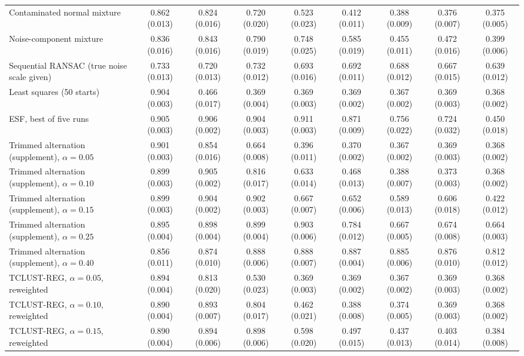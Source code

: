 \begin{table}[htbp]
{\begin{tabular}{lcccccccc}
Contaminated normal mixture & 0.862 (0.013) & 0.824 (0.016) & 0.720 (0.020) & 0.523 (0.023) & 0.412 (0.011) & 0.388 (0.009) & 0.376 (0.007) & 0.375 (0.005) \\
Noise-component mixture & 0.836 (0.016) & 0.843 (0.016) & 0.790 (0.019) & 0.748 (0.025) & 0.585 (0.019) & 0.455 (0.011) & 0.472 (0.016) & 0.399 (0.006) \\
Sequential RANSAC (true noise scale given) & 0.733 (0.013) & 0.720 (0.013) & 0.732 (0.012) & 0.693 (0.016) & 0.692 (0.011) & 0.688 (0.012) & 0.667 (0.015) & 0.639 (0.012) \\
Least squares (50 starts) & 0.904 (0.003) & 0.466 (0.017) & 0.369 (0.004) & 0.369 (0.003) & 0.369 (0.002) & 0.367 (0.002) & 0.369 (0.003) & 0.368 (0.002) \\
ESF, best of five runs & 0.905 (0.003) & 0.906 (0.002) & 0.904 (0.003) & 0.911 (0.003) & 0.871 (0.009) & 0.756 (0.022) & 0.724 (0.032) & 0.450 (0.018) \\
Trimmed alternation (supplement), $\alpha=0.05$ & 0.901 (0.003) & 0.854 (0.016) & 0.664 (0.008) & 0.396 (0.011) & 0.370 (0.002) & 0.367 (0.002) & 0.369 (0.003) & 0.368 (0.002) \\
Trimmed alternation (supplement), $\alpha=0.10$ & 0.899 (0.003) & 0.905 (0.002) & 0.816 (0.017) & 0.633 (0.014) & 0.468 (0.013) & 0.388 (0.007) & 0.373 (0.003) & 0.368 (0.002) \\
Trimmed alternation (supplement), $\alpha=0.15$ & 0.899 (0.003) & 0.904 (0.002) & 0.902 (0.003) & 0.667 (0.007) & 0.652 (0.006) & 0.589 (0.013) & 0.606 (0.018) & 0.422 (0.012) \\
Trimmed alternation (supplement), $\alpha=0.25$ & 0.895 (0.004) & 0.898 (0.004) & 0.899 (0.004) & 0.903 (0.006) & 0.784 (0.012) & 0.667 (0.005) & 0.674 (0.008) & 0.664 (0.003) \\
Trimmed alternation (supplement), $\alpha=0.40$ & 0.856 (0.011) & 0.874 (0.010) & 0.888 (0.006) & 0.888 (0.007) & 0.887 (0.004) & 0.885 (0.006) & 0.876 (0.010) & 0.812 (0.012) \\
TCLUST-REG, $\alpha=0.05$, reweighted & 0.894 (0.004) & 0.813 (0.020) & 0.530 (0.023) & 0.369 (0.003) & 0.369 (0.002) & 0.367 (0.002) & 0.369 (0.003) & 0.368 (0.002) \\
TCLUST-REG, $\alpha=0.10$, reweighted & 0.890 (0.004) & 0.893 (0.007) & 0.804 (0.017) & 0.462 (0.021) & 0.388 (0.008) & 0.374 (0.005) & 0.369 (0.003) & 0.368 (0.002) \\
TCLUST-REG, $\alpha=0.15$, reweighted & 0.890 (0.004) & 0.894 (0.006) & 0.898 (0.006) & 0.598 (0.020) & 0.497 (0.015) & 0.437 (0.013) & 0.403 (0.014) & 0.384 (0.008) \\
\bottomrule
\end{tabular}}
\end{table}

